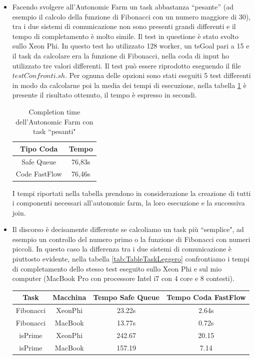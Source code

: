 \documentclass[12pt]{report}
\begin{document}
\begin{itemize}
\item Facendo svolgere all'Autonomic Farm un task abbastanza ``pesante'' (ad esempio il calcolo della funzione di Fibonacci con un numero maggiore di 30), tra i due sistemi di comunicazione non sono presenti grandi differenti e il tempo di completamento è molto simile.
Il test in questione è stato svolto sullo Xeon Phi.
In questo test ho utilizzato 128 worker, un tsGoal pari a 15 e il task da calcolare era la funzione di Fibonacci, nella coda di input ho utilizzato tre valori differenti.
Il test può essere riprodotto eseguendo il file $testConfronti.sh$. Per ognuna delle opzioni sono stati eseguiti 5 test differenti in modo da calcolarne poi la media dei tempi di esecuzione, nella tabella \ref{tab:TableTaskPesante} è presente il risultato ottenuto, il tempo è espresso in secondi.

\begin{table}[H]
\begin{center}
\begin{tabular}[b]{cc}\hline
    Tipo Coda & Tempo\\
    \hline
    Safe Queue & 76,83s\\
    Code FastFlow & 76,46s\\ \hline
\end{tabular}
\end{center}

\caption{\label{tab:TableTaskPesante}Completion time dell'Autonomic Farm con task ``pesanti"}
\end{table}


I tempi riportati nella tabella prendono in considerazione la creazione di tutti i componenti necessari all'autonomic farm, la loro esecuzione e la successiva join.

\item Il discorso è decisamente differente se calcoliamo un task più ``semplice", ad esempio un controllo del numero primo o la funzione di Fibonacci con numeri piccoli.
In questo caso la differenza tra i due sistemi di comunicazione è piuttosto evidente, nella tabella \ref{tab:TableTaskLeggero} confrontiamo i tempi di completamento dello stesso test eseguito sullo Xeon Phi e sul mio computer (MacBook Pro con processore Intel i7 con 4 core e 8 contesti).
    \begin{table}[H]
    \begin{center}
    \begin{tabular}[b]{cccc}\hline
    Task & Macchina & Tempo Safe Queue & Tempo Coda FastFlow\\ \hline
    Fibonacci & XeonPhi & 23.22s & 2.64s\\
    Fibonacci & MacBook & 13.77s & 0.72s\\
    isPrime & XeonPhi & 242.67 & 20.15\\
    isPrime & MacBook & 157.19 & 7.14\\
    \hline
    \end{tabular}
    \end{center}
    

\end{table}
\end{itemize}
\end{document}
